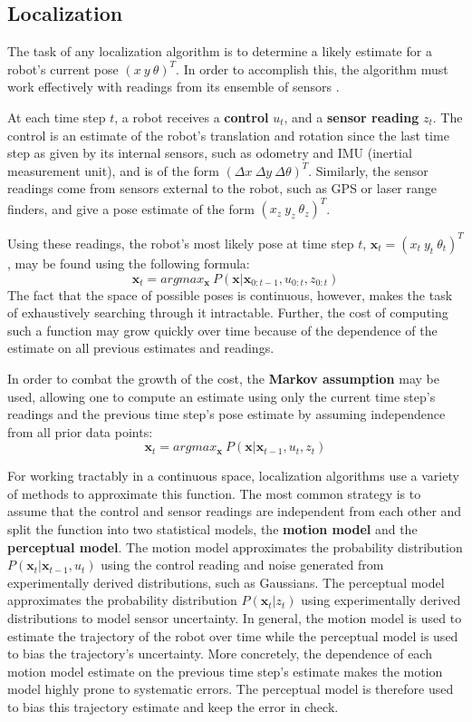 \documentclass[letterpaper, 12 pt, conference]{ieeeconf}  %
\begin{document}
\subsection{Localization}
The task of any localization algorithm is to determine a likely estimate for a robot's current pose $(x~y~\theta)^T$. In order to accomplish this, the algorithm must work effectively with readings from its ensemble of sensors \cite{thrun2002robotic}. 
\par
At each time step $t$, a robot receives a \textbf{control} $u_t$, and a \textbf{sensor reading} $z_t$. The control is an estimate of the robot's translation and rotation since the last time step as given by its internal sensors, such as odometry and IMU (inertial measurement unit), and is of the form $(\Delta x~\Delta y~\Delta \theta)^T$. Similarly, the sensor readings come from sensors external to the robot, such as GPS or laser range finders, and give a pose estimate of the form $(x_z~y_z~\theta _z)^T$. 
\par 
Using these readings, the robot's most likely pose at time step $t$,  $\textbf{x}_t=(x_t~y_t~\theta _t)^T$, may be found using the following formula: 
$$
\textbf{x}_t = argmax_{\textbf{x}}~P(\textbf{x}|\textbf{x}_{0:t-1}, u_{0:t}, z_{0:t})
$$
The fact that the space of possible poses is continuous, however, makes the task of exhaustively searching through it intractable. Further, the cost of computing such a function may grow quickly over time because of the dependence of the estimate on all previous estimates and readings. 
\par
In order to combat the growth of the cost, the \textbf{Markov assumption} may be used, allowing one to compute an estimate using only the current time step's readings and the previous time step's pose estimate by assuming independence from all prior data points:
$$
\textbf{x}_t = argmax_{\textbf{x}}~P(\textbf{x}|\textbf{x}_{t-1}, u_t, z_t)
$$
\par
For working tractably in a continuous space, localization algorithms use a variety of methods to approximate this function. The most common strategy is to assume that the control and sensor readings are independent from each other and split the function into two statistical models, the \textbf{motion model} and the \textbf{perceptual model}. The motion model approximates the probability distribution $P(\textbf{x}_t|\textbf{x}_{t-1},u_t)$ using the control reading and noise generated from experimentally derived distributions, such as Gaussians. The perceptual model approximates the probability distribution $P(\textbf{x}_t|z_t)$ using experimentally derived distributions to model sensor uncertainty. In general, the motion model is used to estimate the trajectory of the robot over time while the perceptual model is used to bias the trajectory's uncertainty. More concretely, the dependence of each motion model estimate on the previous time step's estimate makes the motion model highly prone to systematic errors. The perceptual model is therefore used to bias this trajectory estimate and keep the error in check. 
\end{document}
